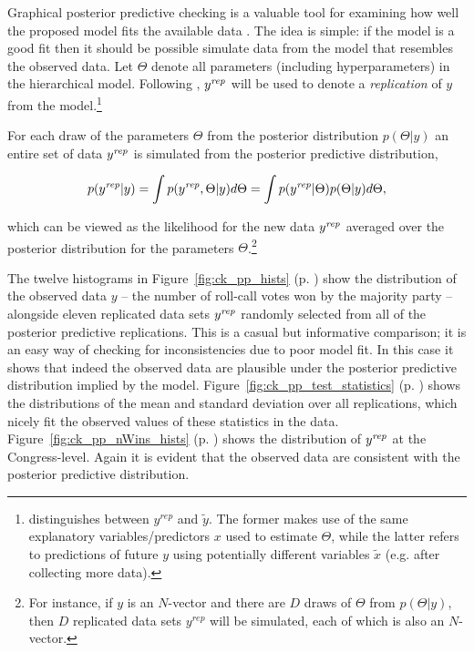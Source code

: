 Graphical posterior predictive checking is a valuable tool for examining how well the proposed model 
fits the available data . The idea is simple: if the model is a good fit 
then it should be possible simulate data from the model that resembles the observed data. Let $\Theta$ 
denote all parameters (including hyperparameters) in the hierarchical model. Following 
 , $y^{\it rep}$ will be used to denote a {\it replication} of $y$ from the model.\footnote{ distinguishes between $y^{rep}$ and $\tilde{y}$. The former 
 makes use of the same explanatory variables/predictors $x$ used to estimate $\Theta$, while the latter 
 refers to predictions of future $y$ using potentially different variables $\tilde{x}$ (e.g. after collecting more data).}

For each draw of the parameters $\Theta$ from the posterior distribution $p(\Theta | y)$ an entire set 
of data $y^{\it rep} $ is simulated from the posterior predictive distribution,

\begin{equation*}
 p(y^{\it rep} | y) = \int p(y^{\it rep}, \Theta | y) d\Theta = \int p(y^{\it rep} | \Theta) p(\Theta | y) d\Theta,
\end{equation*}

\noindent which can be viewed as the likelihood for the new data $y^{\it rep}$ averaged over 
the posterior distribution for the parameters $\Theta$.\footnote{For instance, if $y$ is an $N$-vector 
and there are $D$ draws of $\Theta$ from $p(\Theta | y)$, then $D$ replicated data sets $y^{rep}$ 
will be simulated, each of which is also an $N$-vector.}

The twelve histograms in Figure~\ref{fig:ck_pp_hists} (p. \pageref{fig:ck_pp_hists}) show the 
distribution of the observed data $y$ -- the number of roll-call votes won by the majority party 
-- alongside eleven replicated data sets $y^{\it rep}$ randomly selected from all of the posterior 
predictive replications. This is a casual but informative comparison; it is an easy way of checking 
for inconsistencies due to poor model fit. In this case it shows that indeed the observed data are 
plausible under the posterior predictive distribution implied by the model. 
Figure~\ref{fig:ck_pp_test_statistics} (p. \pageref{fig:ck_pp_test_statistics}) shows the distributions 
of the mean and standard deviation over all replications, which nicely fit the observed values of these 
statistics in the data. Figure~\ref{fig:ck_pp_nWins_hists} (p. \pageref{fig:ck_pp_nWins_hists}) shows 
the distribution of $y^{\it rep}$ at the Congress-level. Again it is evident that the observed data are consistent 
with the posterior predictive distribution. 


